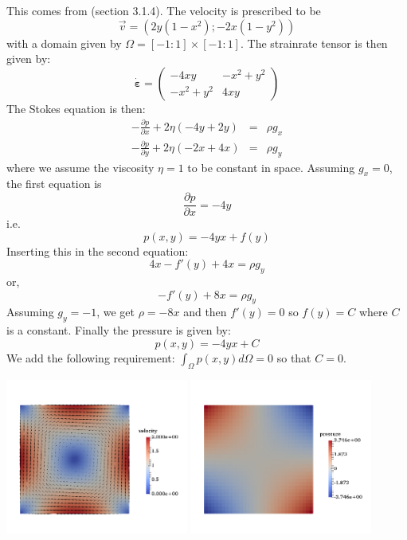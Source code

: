 This comes from \cite{elsw}(section 3.1.4). The velocity is prescribed to be
\[
{\vec v}=(2y(1-x^2) ; -2x(1-y^2) )
\]
with a domain given by $\Omega=[-1:1]\times[-1:1]$.
The strainrate tensor is then given by:
\[
\dot{\bm \varepsilon}=
\left(
\begin{array}{cc}
-4xy & -x^2+y^2  \\
-x^2+y^2 & 4xy   
\end{array}
\right)
\]
The Stokes equation is then:
\begin{eqnarray}
-\frac{\partial p}{\partial x} + 2\eta ( -4y + 2y ) &=& \rho g_x \\
-\frac{\partial p}{\partial y} + 2\eta ( -2x + 4x ) &=& \rho g_y
\end{eqnarray}
where we assume the viscosity $\eta=1$ to be constant in space.
Assuming $g_x=0$, the first equation is
\[
\frac{\partial p}{\partial x} = - 4 y
\]
i.e.
\[
p(x,y)= -4  y x +f(y)
\]
Inserting this in the second equation:
\[
4  x - f'(y) + 4 x  = \rho g_y
\]
or,
\[
-f'(y) + 8  x  = \rho g_y
\]
Assuming $g_y=-1$, we get $\rho=-8x$ and then $f'(y)=0$ so $f(y)=C$ where $C$
is a constant.
Finally the pressure is given by:
\[
p(x,y)=-4  y x + C
\]
We add the following requirement: $\int_\Omega p(x,y) d\Omega =0$ so that $C=0$.

\begin{center}
\includegraphics[width=6cm]{images/benchmark_ldc_anal/velo}
\includegraphics[width=6cm]{images/benchmark_ldc_anal/press}
\end{center}

